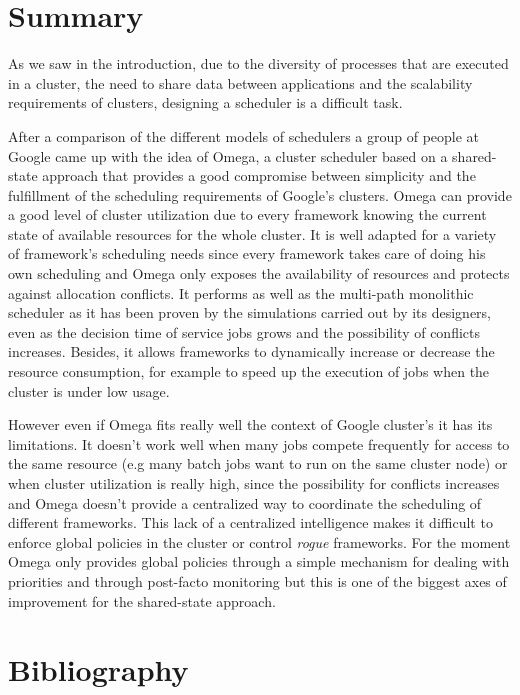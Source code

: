 \documentclass{svjour3}                     %
\begin{document}
\section{Summary}

As we saw in the introduction, due to the diversity of processes that
are executed in a cluster, the need to share data between applications
and the scalability requirements of clusters, designing a scheduler is
a difficult task.

After a comparison of the different models of schedulers a group of
people at Google came up with the idea of Omega, a cluster scheduler
based on a shared-state approach that provides a good compromise
between simplicity and the fulfillment of the scheduling requirements
of Google's clusters. Omega can provide a good level of cluster
utilization due to every framework knowing the current state of
available resources for the whole cluster. It is well adapted for a
variety of framework's scheduling needs since every framework takes
care of doing his own scheduling and Omega only exposes the
availability of resources and protects against allocation
conflicts. It performs as well as the multi-path monolithic scheduler
as it has been proven by the simulations carried out by its designers,
even as the decision time of service jobs grows and the possibility of
conflicts increases. Besides, it allows frameworks to dynamically
increase or decrease the resource consumption, for example to speed up
the execution of jobs when the cluster is under low usage.

However even if Omega fits really well the context of Google cluster's
it has its limitations. It doesn't work well when many jobs compete
frequently for access to the same resource (e.g many batch jobs want to run
on the same cluster node) or when cluster utilization is really high,
since the possibility for conflicts increases and Omega doesn't
provide a centralized way to coordinate the scheduling of different
frameworks. This lack of a centralized intelligence makes it difficult
to enforce global policies in the cluster or control \emph{rogue}
frameworks. For the moment Omega only provides global policies through
a simple mechanism for dealing with priorities and through post-facto
monitoring but this is one of the biggest axes of improvement for the
shared-state approach.

\section{Bibliography}


\printbibliography
\end{document}
